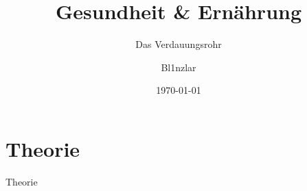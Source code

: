 \documentclass[xcolor=dvipsnames]{beamer}
\title{Gesundheit \& Ernährung}
\subtitle{Das Verdauungsrohr}
\author{Bl1nzlar}
\date{\today}
\begin{document}
    \maketitle


    \section{Theorie}
    {
    \begin{frame}
        \begin{center}
            \Huge Theorie
        \end{center}
    \end{frame}
    }
\end{document}
